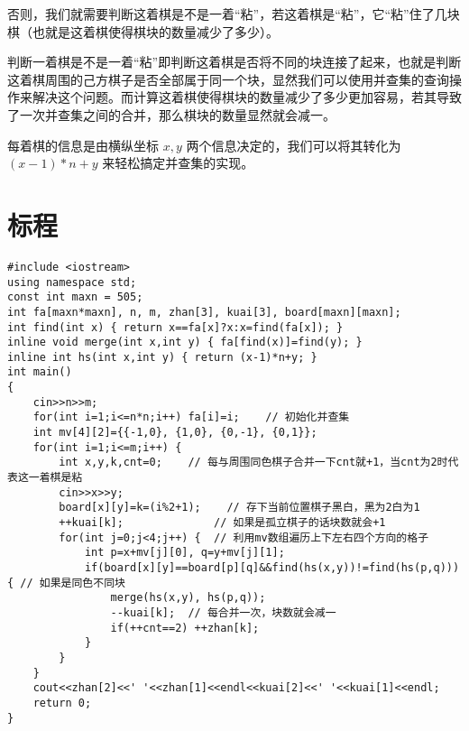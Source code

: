 \documentclass{ctsol}
\begin{document}
否则，我们就需要判断这着棋是不是一着“粘”，若这着棋是“粘”，它“粘”住了几块棋（也就是这着棋使得棋块的数量减少了多少）。

判断一着棋是不是一着“粘”即判断这着棋是否将不同的块连接了起来，也就是判断这着棋周围的己方棋子是否全部属于同一个块，显然我们可以使用并查集的查询操作来解决这个问题。而计算这着棋使得棋块的数量减少了多少更加容易，若其导致了一次并查集之间的合并，那么棋块的数量显然就会减一。

每着棋的信息是由横纵坐标 $x,y$ 两个信息决定的，我们可以将其转化为 $(x-1)*n + y$ 来轻松搞定并查集的实现。

\section*{标程}
\small
\begin{lstlisting}
#include <iostream>
using namespace std;
const int maxn = 505;
int fa[maxn*maxn], n, m, zhan[3], kuai[3], board[maxn][maxn];
int find(int x) { return x==fa[x]?x:x=find(fa[x]); }
inline void merge(int x,int y) { fa[find(x)]=find(y); }
inline int hs(int x,int y) { return (x-1)*n+y; }
int main()
{
    cin>>n>>m;
    for(int i=1;i<=n*n;i++) fa[i]=i;    // 初始化并查集
    int mv[4][2]={{-1,0}, {1,0}, {0,-1}, {0,1}};
    for(int i=1;i<=m;i++) {
        int x,y,k,cnt=0;    // 每与周围同色棋子合并一下cnt就+1，当cnt为2时代表这一着棋是粘
        cin>>x>>y;
        board[x][y]=k=(i%2+1);    // 存下当前位置棋子黑白，黑为2白为1
        ++kuai[k];              // 如果是孤立棋子的话块数就会+1
        for(int j=0;j<4;j++) {  // 利用mv数组遍历上下左右四个方向的格子
            int p=x+mv[j][0], q=y+mv[j][1];
            if(board[x][y]==board[p][q]&&find(hs(x,y))!=find(hs(p,q))) { // 如果是同色不同块
                merge(hs(x,y), hs(p,q));
                --kuai[k];  // 每合并一次，块数就会减一
                if(++cnt==2) ++zhan[k];
            }
        }
    }
    cout<<zhan[2]<<' '<<zhan[1]<<endl<<kuai[2]<<' '<<kuai[1]<<endl;
    return 0;
}
\end{lstlisting}
\normalsize
\end{document}
